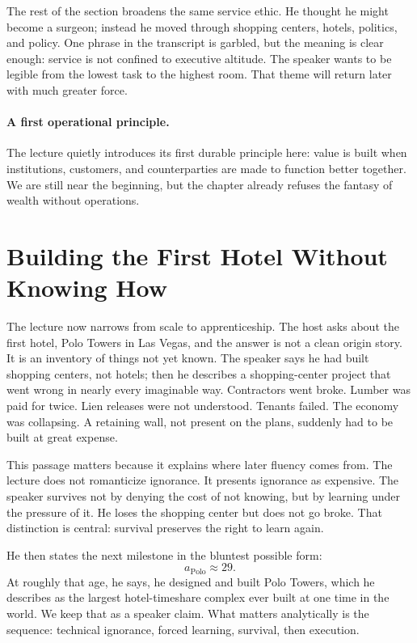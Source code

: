 The rest of the section broadens the same service ethic. He thought he might become a surgeon; instead he moved through shopping centers, hotels, politics, and policy. One phrase in the transcript is garbled, but the meaning is clear enough: service is not confined to executive altitude. The speaker wants to be legible from the lowest task to the highest room. That theme will return later with much greater force.

\paragraph{A first operational principle.}
The lecture quietly introduces its first durable principle here: value is built when institutions, customers, and counterparties are made to function better together. We are still near the beginning, but the chapter already refuses the fantasy of wealth without operations.

\section{Building the First Hotel Without Knowing How}

The lecture now narrows from scale to apprenticeship. The host asks about the first hotel, Polo Towers in Las Vegas, and the answer is not a clean origin story. It is an inventory of things not yet known. The speaker says he had built shopping centers, not hotels; then he describes a shopping-center project that went wrong in nearly every imaginable way. Contractors went broke. Lumber was paid for twice. Lien releases were not understood. Tenants failed. The economy was collapsing. A retaining wall, not present on the plans, suddenly had to be built at great expense.

This passage matters because it explains where later fluency comes from. The lecture does not romanticize ignorance. It presents ignorance as expensive. The speaker survives not by denying the cost of not knowing, but by learning under the pressure of it. He loses the shopping center but does not go broke. That distinction is central: survival preserves the right to learn again.

He then states the next milestone in the bluntest possible form:
\begin{equation}
a_{\mathrm{Polo}}\approx 29.
\end{equation}
At roughly that age, he says, he designed and built Polo Towers, which he describes as the largest hotel-timeshare complex ever built at one time in the world. We keep that as a speaker claim. What matters analytically is the sequence: technical ignorance, forced learning, survival, then execution.

